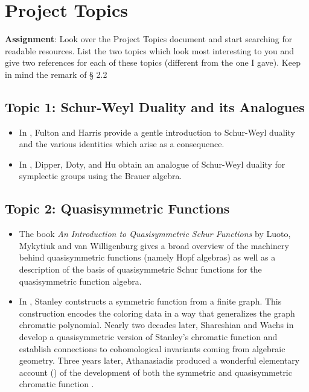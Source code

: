 \documentclass[12pt]{article}
\begin{document}
\newpage

\tableofcontents


\section{Project Topics}
\textbf{Assignment}: Look over the Project Topics document and start searching for readable
resources. List the two topics which look most interesting to you and
give two references for each of these topics (different from the one I gave).
Keep in mind the remark of § 2.2

\subsection*{Topic 1: Schur-Weyl Duality and its Analogues}
\begin{itemize}
  \item In \cite[Ch.4,6]{fultonharris}, Fulton and Harris provide a gentle introduction to Schur-Weyl duality and the various identities which arise as a consequence.
  \item In \cite{dipper:05}, Dipper, Doty, and Hu obtain an analogue of Schur-Weyl duality for symplectic groups using the Brauer algebra. 

\end{itemize}



\subsection*{Topic 2: Quasisymmetric Functions}
\begin{itemize}
  \item The book \textit{An Introduction to Quasisymmetric {S}chur Functions} \cite{qsymschur} by Luoto, Mykytiuk and van Willigenburg gives a broad overview of the machinery behind quasisymmetric functions (namely Hopf algebras) as well as a description of the basis of quasisymmetric {S}chur functions for the quasisymmetric function algebra.
  \item In \cite{stanley:95}, Stanley contstructs a symmetric function from a finite graph. This construction encodes the coloring data in a way that generalizes the graph chromatic polynomial. Nearly two decades later, Shareshian and Wachs in \cite{wachs:12} develop a quasisymmetric version of Stanley's chromatic function and establish connections to cohomological invariants coming from algebraic geometry. Three years later, Athanasiadis produced a wonderful elementary account (\cite{ath}) of the development of both the symmetric and quasisymmetric chromatic function . 
\end{itemize}
\end{document}
